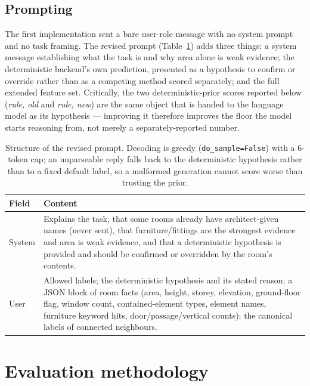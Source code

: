 \documentclass[11pt,a4paper]{article}
\begin{document}
\subsection{Prompting}

The first implementation sent a bare user-role message with no system prompt
and no task framing. The revised prompt (Table~\ref{tab:prompt}) adds three
things: a system message establishing what the task is and why area alone is
weak evidence; the deterministic backend's own prediction, presented as a
hypothesis to confirm or override rather than as a competing method scored
separately; and the full extended feature set. Critically, the two
deterministic-prior scores reported below (\emph{rule, old} and \emph{rule,
new}) are the same object that is handed to the language model as its
hypothesis --- improving it therefore improves the floor the model starts
reasoning from, not merely a separately-reported number.

\begin{table}[h]
\centering
\small
\begin{tabular}{@{}p{2.6cm}p{11cm}@{}}
\toprule
\textbf{Field} & \textbf{Content} \\
\midrule
System & Explains the task, that some rooms already have architect-given names
(never sent), that furniture/fittings are the strongest evidence and area is
weak evidence, and that a deterministic hypothesis is provided and should be
confirmed or overridden by the room's contents. \\
User & Allowed labels; the deterministic hypothesis and its stated reason; a
JSON block of room facts (area, height, storey, elevation, ground-floor flag,
window count, contained-element types, element names, furniture keyword
hits, door/passage/vertical counts); the canonical labels of connected
neighbours. \\
\bottomrule
\end{tabular}
\caption{Structure of the revised prompt. Decoding is greedy
(\texttt{do\_sample=False}) with a 6-token cap; an unparseable reply falls back
to the deterministic hypothesis rather than to a fixed default label, so a
malformed generation cannot score worse than trusting the prior.}
\label{tab:prompt}
\end{table}

\section{Evaluation methodology}
\end{document}
